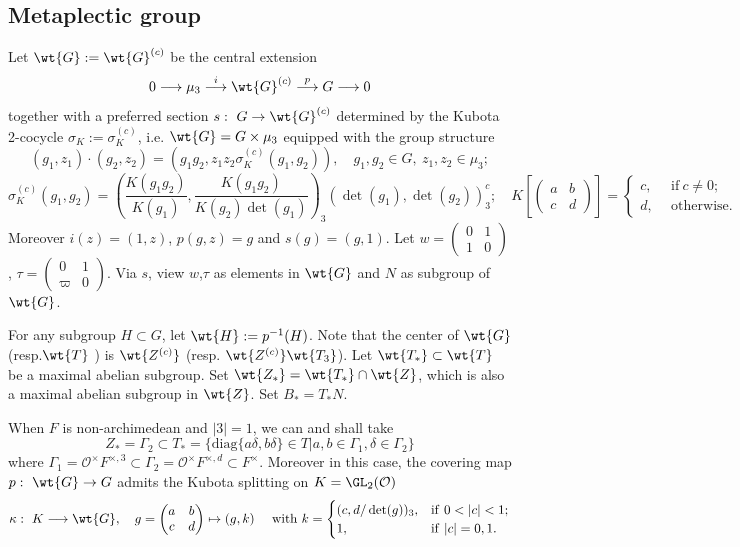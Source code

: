 \documentclass[11pt,reqno]{amsart}
\newcommand{\CO}{{\mathcal {O}}} \newcommand{\CP}{{\mathcal {P}}}
\newcommand{\diag}{{\mathrm{diag}}}
\newcommand{\lra}{\longrightarrow}\newcommand{\lla}{\longleftarrow}
\theoremstyle{plain}
\theoremstyle{remark} \newtheorem{remark}[thm]{Remark}
\theoremstyle{definition} \newtheorem{exercise}[thm]{Exercise}
\theoremstyle{definition} \newtheorem{example}[thm]{Example} \newtheorem{condition}[thm]{Condition}
\numberwithin{equation}{section}
\renewcommand{\-}{\text{--}}
\begin{document}
\subsection{Metaplectic group}
Let $\wt{G}:=\wt{G}^{(c)}$ be the central extension $$0\lra \mu_3\stackrel{i}{\lra} \wt{G}^{(c)}\stackrel{p}{\lra} G\lra0$$
together with a preferred section $s:\ G\to \wt{G}^{(c)}$ determined by the Kubota 2-cocycle $\sigma_K:=\sigma_K^{(c)}$, i.e. $\wt{G}=G\times\mu_3$ equipped with the group structure 
$$(g_1,z_1)\cdot (g_2,z_2)=\left(g_1g_2,z_1z_2\sigma_K^{(c)}(g_1,g_2)\right), \quad g_1,g_2\in G,\ z_1,z_2\in\mu_3;$$
$$\sigma_K^{(c)}(g_1,g_2)=\left(\frac{K(g_1g_2)}{K(g_1)}, \frac{K(g_1g_2)}{K(g_2)\det(g_1)}\right)_3(\det(g_1),\det(g_2))_3^c;\quad K\left[\begin{pmatrix}a & b\\ c & d\end{pmatrix}\right]=
\begin{cases} c,\ &\ \text{if}\ c\neq0;\\
d,\ &\ \text{otherwise}.\end{cases}$$
Moreover $i(z)=(1,z)$, $p(g,z)=g$ and $s(g)=(g,1)$. Let $w=\begin{pmatrix} 0 & 1\\ 1 & 0\end{pmatrix}$, $\tau=\begin{pmatrix} 0 & 1\\ \varpi & 0\end{pmatrix}$. Via $s$, view $w$,$\tau$ as elements in $\wt{G}$ and $N$ as subgroup of $\wt{G}$.  

For  any subgroup $H\subset G$, let $\wt{H}:=p^{-1}(H)$. Note that the center of $\wt{G}$ (resp.$\wt{T}$ ) is $\wt{Z^{(c)}}$ (resp. $\wt{Z^{(c)}}\wt{T_3}$). Let $\wt{T_*}\subset \wt{T}$ be a maximal abelian subgroup. Set $\wt{Z_*}=\wt{T_*}\cap \wt{Z}$, which is also a maximal abelian subgroup in $\wt{Z}$. Set $B_*=T_*N$.

When $F$ is non-archimedean and $|3|=1$, we can and shall take 
\[Z_*=\Gamma_2\subset T_*=\{\diag\{a\delta,b\delta\}\in T|a,b\in \Gamma_1,\delta\in\Gamma_2\} \]
where $\Gamma_1=\CO^\times F^{\times,3}\subset \Gamma_2=\CO^\times F^{\times,d}\subset F^\times$.
Moreover in this case, the covering map $p:\ \wt{G}\to G$ admits the Kubota splitting on $K=\GL_2(\CO)$ $$\kappa:\ K\lra \wt{G},\quad g=\begin{pmatrix} a & b\\ c & d\end{pmatrix}\mapsto (g,k)\quad\text{ with } k=\begin{cases} (c,d/\det(g))_3, & \mathrm{if}\ 0<|c|<1;\\
1, & \mathrm{if}\ |c|=0,1.\end{cases}$$  
\end{document}
